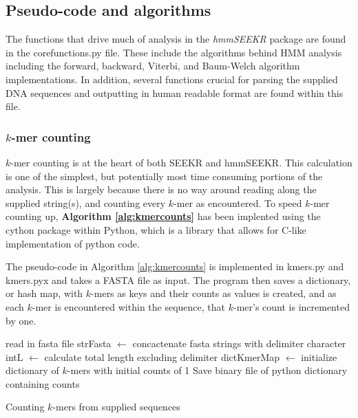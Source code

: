 \subsection{Pseudo-code and algorithms}
The functions that drive much of analysis in the \emph{hmmSEEKR} package are found in the corefunctions.py file. These include the algorithms behind HMM analysis including the forward, backward, Viterbi, and Baum-Welch algorithm implementations. In addition, several functions crucial for parsing the supplied DNA sequences and outputting in human readable format are found within this file.

\subsubsection{$k$-mer counting}
$k$-mer counting is at the heart of both SEEKR and hmmSEEKR. This calculation is one of the simplest, but potentially most time consuming portions of the analysis. This is largely because there is no way around reading along the supplied string(s), and counting every $k$-mer as encountered. To speed $k$-mer counting up, \textbf{Algorithm \ref{alg:kmercounts}} has been implented using the cython package within Python, which is a library that allows for C-like implementation of python code.

The pseudo-code in Algorithm \ref{alg:kmercounts} is implemented in kmers.py and kmers.pyx and takes a FASTA file as input. The program then saves a dictionary, or hash map, with $k$-mers as keys and their counts as values is created, and as each $k$-mer is encountered within the sequence, that $k$-mer's count is incremented by one.

\begin{algorithm}[h]
\DontPrintSemicolon
{}
\SetAlgoLined
{}
 read in fasta file\;
 strFasta $\leftarrow$ concactenate fasta strings with delimiter character\;
 intL $\leftarrow$ calculate total length excluding delimiter\;
 dictKmerMap $\leftarrow$ initialize dictionary of $k$-mers with initial counts of 1\;
 Save binary file of python dictionary containing counts
 \caption{Counting $k$-mers from supplied sequences}
 \label{alg:kmercounts}
\end{algorithm}

